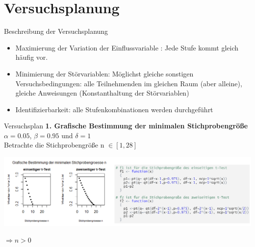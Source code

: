 \documentclass[ ngerman, fontsize= 10pt, headings=big, titlepage=true, xcolor=dvipsnames]{beamer}
\begin{document}
\section{Versuchsplanung}
\begin{frame}{Beschreibung der Versuchsplanung}
\begin{itemize}
\item Maximierung der Variation  der Einflussvariable : Jede Stufe kommt gleich häufig vor.\\
\item Minimierung der Störvariablen: Möglichst gleiche sonstigen Versuchsbedingungen: alle Teilnehmenden im gleichen Raum (aber alleine), gleiche Anweisungen	(Konstanthaltung der Störvariablen)
\item Identifizierbarkeit: alle Stufenkombinationen werden durchgeführt
\end{itemize}
\end{frame}

\begin{frame}[fragile]{Versuchsplan}
	\textbf{1. Grafische Bestimmung der minimalen Stichprobengröße}\\
	$\alpha =0.05$, $\beta = 0.95$ und $\delta =1$\\
	 Betrachte die Stichprobengröße n $\in [1,28]$
	 

	\includegraphics[scale=0.37]{Stichprobengröße.png}
 


	$\Rightarrow n > 0$
\end{frame}
\end{document}
